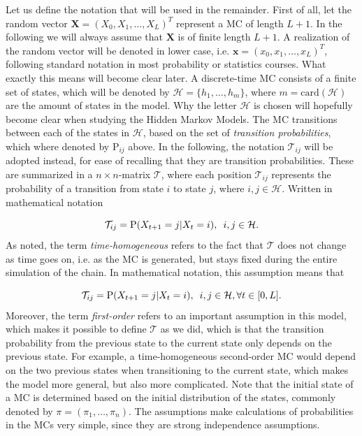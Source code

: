 \documentclass{article}
\begin{document}
Let us define the notation that will be used in the remainder. First of all, let the random vector $\mathbf{X} = (X_0, X_1, \ldots, X_L)^T$ represent a MC of length $L+1$. In the following we will always assume that $\mathbf{X}$ is of finite length $L+1$. A realization of the random vector will be denoted in lower case, i.e. $\mathbf{x} = (x_0, x_1, \ldots, x_L)^T$, following standard notation in most probability or statistics courses. What exactly this means will become clear later. A discrete-time MC consists of a finite set of states, which will be denoted by $\mathcal{H} = \{h_1, \ldots, h_m\}$, where $m = \text{card}(\mathcal{H})$ are the amount of states in the model. Why the letter $\mathcal{H}$ is chosen will hopefully become clear when studying the Hidden Markov Models. The MC transitions between each of the states in $\mathcal{H}$, based on the set of \textit{transition probabilities}, which where denoted by $\text{P}_{ij}$ above. In the following, the notation $\mathcal{T}_{ij}$ will be adopted instead, for ease of recalling that they are transition probabilities. These are summarized in a $n \times n$-matrix $\mathcal{T}$, where each position $\mathcal{T}_{ij}$ represents the probability of a transition from state $i$ to state $j$, where $i, j \in \mathcal{H}$. Written in mathematical notation

\begin{equation*}
        \mathcal{T}_{ij} = \text{P}(X_{t+1} = j|X_{t} = i), \hspace{0.5em} i,j \in \mathcal{H}. 
\end{equation*}
As noted, the term \textit{time-homogeneous} refers to the fact that $\mathcal{T}$ does not change as time goes on, i.e. as the MC is generated, but stays fixed during the entire simulation of the chain. In mathematical notation, this assumption means that

\begin{equation*}
    \mathcal{T}_{ij} = \text{P}(X_{t+1} = j|X_{t} = i), \hspace{0.5em} i,j \in \mathcal{H}, \forall t \in [0,L].
\end{equation*}
Moreover, the term \textit{first-order} refers to an important assumption in this model, which makes it possible to define $\mathcal{T}$ as we did, which is that the transition probability from the previous state to the current state only depends on the previous state. For example, a time-homogeneous second-order MC would depend on the two previous states when transitioning to the current state, which makes the model more general, but also more complicated. Note that the initial state of a MC is determined based on the initial distribution of the states, commonly denoted by $\pi = (\pi_1, \ldots, \pi_n)$. The assumptions make calculations of probabilities in the MCs very simple, since they are strong independence assumptions. 
\end{document}
